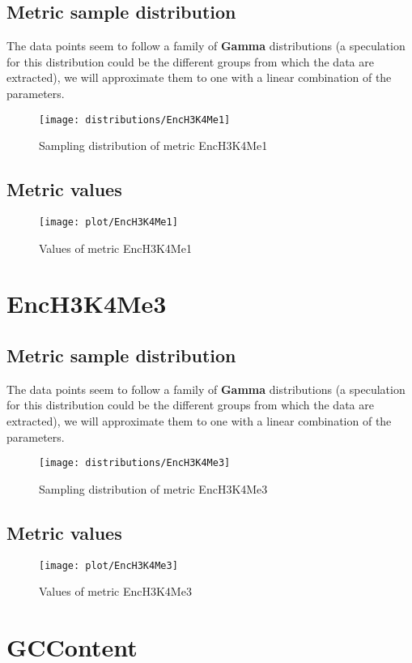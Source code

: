\documentclass[\main/main.tex]{subfiles}
\begin{document}
\subsection{Metric sample distribution}
The data points seem to follow a family of \textbf{Gamma} distributions (a speculation for this distribution could be the different groups from which the data are extracted), we will approximate them to one with a linear combination of the parameters.

\begin{figure}
  \texttt{[image: distributions/EncH3K4Me1]}
  \caption{Sampling distribution of metric EncH3K4Me1}
\end{figure}
\subsection{Metric values}
\begin{figure}
  \texttt{[image: plot/EncH3K4Me1]}
  \caption{Values of metric EncH3K4Me1}
\end{figure}

\clearpage
\section{EncH3K4Me3}
\subsection{Metric sample distribution}
The data points seem to follow a family of \textbf{Gamma} distributions (a speculation for this distribution could be the different groups from which the data are extracted), we will approximate them to one with a linear combination of the parameters.

\begin{figure}
  \texttt{[image: distributions/EncH3K4Me3]}
  \caption{Sampling distribution of metric EncH3K4Me3}
\end{figure}
\subsection{Metric values}
\begin{figure}
  \texttt{[image: plot/EncH3K4Me3]}
  \caption{Values of metric EncH3K4Me3}
\end{figure}

\clearpage
\section{GCContent}
\end{document}
